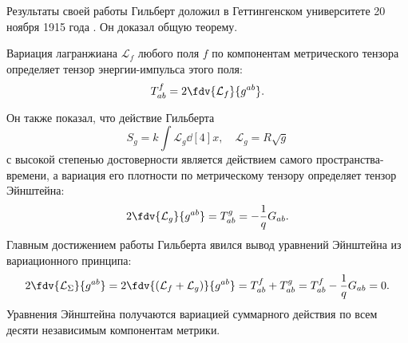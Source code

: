 \documentclass[\docroot/reports/draft/report.tex]{subfiles}
\begin{document}
    Результаты своей работы Гильберт доложил в Геттингенском университете 20 ноября 1915 года \cite{gilbert_phys}. Он доказал общую теорему.
    \begin{theorem*}
        Вариация лагранжиана $\mathcal{L}_f$ любого поля $f$ по компонентам метрического тензора определяет тензор энергии-импульса этого поля:
        \begin{equation*}
            T^f_{ab} = 2 \fdv{\mathcal{L}_f}{g^{ab}} .
        \end{equation*}
    \end{theorem*}
    Он также показал, что действие Гильберта
    \begin{equation*}
        S_g = k \int \mathcal{L}_g \dd[4]{x} , \quad \mathcal{L}_g = R \sqrt g
    \end{equation*}
    с высокой степенью достоверности является действием самого пространства-времени, а вариация его плотности по метрическому тензору определяет тензор Эйнштейна:
    \begin{equation*}
        2\fdv{\mathcal{L}_g}{g^{ab}} = T^g_{ab} = - \frac{1}{q} G_{ab} .
    \end{equation*}
    Главным достижением работы Гильберта явился вывод уравнений Эйнштейна из вариационного принципа:
    \begin{equation*}
        2 \fdv{\mathcal{L}_\Sigma}{g^{ab}} =
        2 \fdv{(\mathcal{L}_f + \mathcal{L}_g)}{g^{ab}} =
        T^f_{ab} + T^g_{ab} =
        T^f_{ab} - \frac{1}{q} G_{ab} =
        0 .
    \end{equation*}
    Уравнения Эйнштейна получаются вариацией суммарного действия по всем десяти независимым компонентам метрики.

\end{document}
